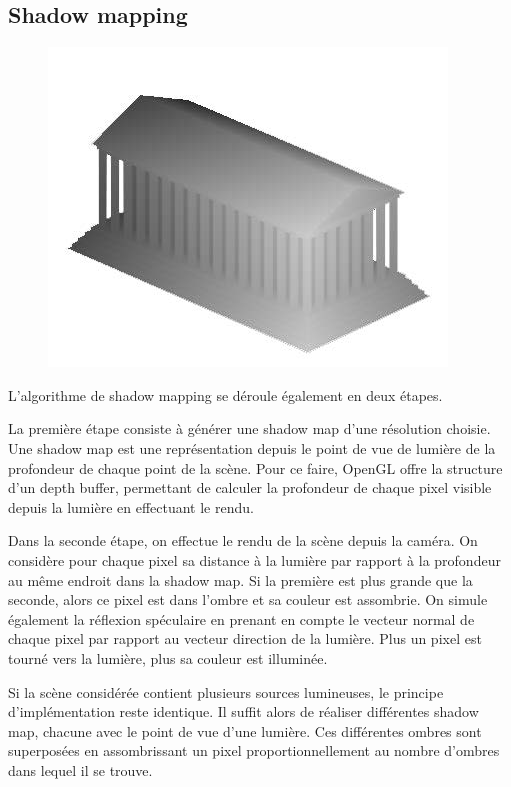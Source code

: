 \documentclass[a4paper,10pt]{report}
\begin{document}
\subsection{Shadow mapping}

\begin{figure}[H]
\includegraphics[scale=0.3]{images/shadow_map.jpg}
\centering
{}
\end{figure}

L'algorithme de shadow mapping se déroule également en deux étapes.

La première étape consiste à générer une shadow map d'une résolution choisie. Une shadow map est une représentation depuis le point de vue de lumière de la profondeur de chaque point de la scène. Pour ce faire, OpenGL offre la structure d'un depth buffer, permettant de calculer la profondeur de chaque pixel visible depuis la lumière en effectuant le rendu.

Dans la seconde étape, on effectue le rendu de la scène depuis la caméra. On considère pour chaque pixel sa distance à la lumière par rapport à la profondeur au même endroit dans la shadow map. Si la première est plus grande que la seconde, alors ce pixel est dans l'ombre et sa couleur est assombrie.
On simule également la réflexion spéculaire en prenant en compte le vecteur normal de chaque pixel par rapport au vecteur direction de la lumière. Plus un pixel est tourné vers la lumière, plus sa couleur est illuminée.

Si la scène considérée contient plusieurs sources lumineuses, le principe d'implémentation reste identique. Il suffit alors de réaliser différentes shadow map, chacune avec le point de vue d'une lumière. Ces différentes ombres sont superposées en assombrissant un pixel proportionnellement au nombre d'ombres dans lequel il se trouve.
\end{document}
